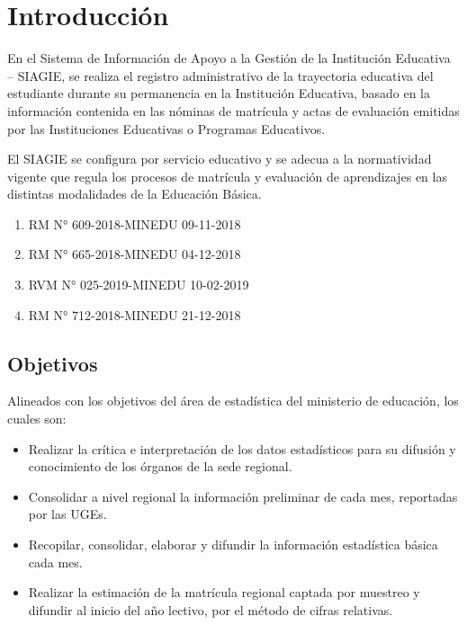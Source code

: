 \chapter{Introducción} %
\label{Chapter1} %


\newcommand{\keyword}[1]{\textbf{#1}}
\newcommand{\tabhead}[1]{\textbf{#1}}
\newcommand{\code}[1]{\texttt{#1}}
\newcommand{\file}[1]{\texttt{\bfseries#1}}
\newcommand{\option}[1]{\texttt{\itshape#1}}
En el Sistema de Información de Apoyo a la Gestión de la Institución Educativa – SIAGIE, se realiza el registro administrativo de la trayectoria educativa del estudiante durante su permanencia en la Institución Educativa, basado en la información contenida en las nóminas de matrícula y actas de evaluación emitidas por las Instituciones Educativas o Programas Educativos. 

El SIAGIE se configura por servicio educativo y se adecua a la normatividad vigente que regula los procesos de matrícula y evaluación de aprendizajes en las distintas modalidades de la Educación Básica. 

\begin{enumerate}
\item RM N° 609-2018-MINEDU 09-11-2018
\item RM N° 665-2018-MINEDU 04-12-2018
\item RVM N° 025-2019-MINEDU 10-02-2019
\item RM N° 712-2018-MINEDU 21-12-2018
\end{enumerate}

\section{Objetivos}

Alineados con los objetivos del área de estadística del ministerio de educación, los cuales son: 

\begin{itemize}
\item Realizar la crítica e interpretación de los datos estadísticos para su difusión y conocimiento de los órganos de la sede regional. 
\item Consolidar a nivel regional la información preliminar de cada mes, reportadas por las UGEs. 
\item Recopilar, consolidar, elaborar y difundir la información estadística básica cada mes.
\item Realizar la estimación de la matrícula regional captada por muestreo y difundir al inicio del año lectivo, por el método de cifras relativas.
\end{itemize}

